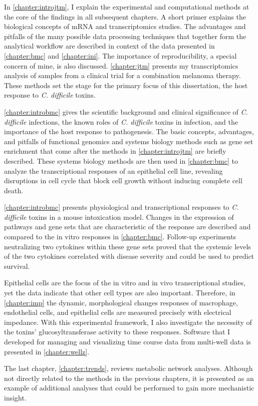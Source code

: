 In \autoref{chapter:introjtm}, I explain the experimental and computational
methods at the core of the findings in all subsequent chapters.
A short primer explains the biological concepts of mRNA and transcriptomics
studies. The advantages and pitfalls of the many possible data processing
techniques that together form the analytical workflow are described in context
of the data presented in \autoref{chapter:bmc} and \autoref{chapter:ini}. 
The importance of reproducibility, a special concern of mine, is also 
discussed. \autoref{chapter:jtm} presents my transcriptomics analysis of
samples from a clinical trial for a combination melanoma therapy.
These methods set the stage for the primary focus of this dissertation,
the host response to \textit{C. difficile} toxins.

\autoref{chapter:introbmc} gives the scientific background
and clinical significance of \textit{C. difficile} infections, 
the known roles of \textit{C. difficile} toxins in infection,
and the importance of the host response to pathogenesis.
The basic concepts, advantages, and pitfalls of functional genomics 
and systems biology methods such as
gene set enrichment that come after the methods in \autoref{chapter:introjtm}
are briefly described. These systems biology methods are then used in \autoref{chapter:bmc}
to analyze the transcriptional responses of an epithelial cell line, revealing
disruptions in cell cycle that block cell growth without inducing
complete cell death.

\autoref{chapter:introbmc} presents physiological 
and transcriptional responses to \textit{C. difficile} toxins
in a mouse intoxication model. Changes in the expression of pathways and gene sets that
are characteristic of the response are described and compared to
the in vitro responses in \autoref{chapter:bmc}.
Follow-up experiments neutralizing two cytokines within
these gene sets proved that the systemic levels of the two cytokines
correlated with disease severity and could be used to
predict survival.

Epithelial cells are the focus of the in vitro and in vivo
transcriptional studies, yet the data indicate that other cell types
are also important. Therefore, in \autoref{chapter:imp}
the dynamic, morphological changes responses of macrophage, endothelial cells, 
and epithelial
cells are measured precisely with electrical impedance.
With this experimental framework, I also investigate the necessity
of the toxins' glucosyltransferase activity to these responses.
Software that I developed for managing and visualizing time course data from
multi-well data is presented in \autoref{chapter:wellz}.

The last chapter, \autoref{chapter:trends}, reviews
metabolic network analyses. Although not directly related to
the methods in the previous chapters, it is presented as an
example of additional analyses that could be performed
to gain more mechanistic insight.



